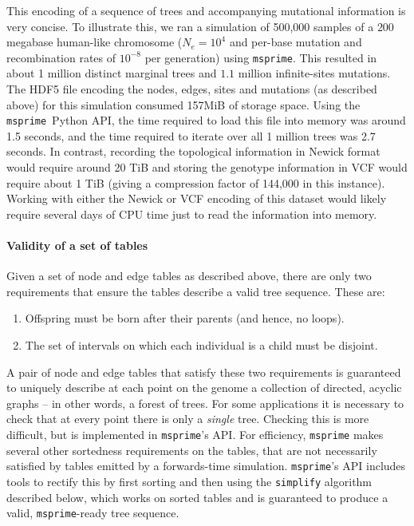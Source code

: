 \documentclass{article}
\newcommand{\msprime}{\texttt{msprime}}
\newcommand{\jda}[1]{{\em \color{cyan} #1}}
\begin{document}
This encoding of a sequence of trees and accompanying mutational information is
very concise. To illustrate this, we ran a simulation of 500,000 samples of a
$200$ megabase human-like chromosome ($N_e=10^4$ and per-base mutation and
recombination rates of $10^{-8}$ per generation) using \msprime. This resulted
in about 1 million distinct marginal trees and $1.1$ million infinite-sites
mutations. The HDF5 file encoding the nodes, edges, sites and mutations (as
described above) for this simulation consumed 157MiB of storage space. Using
the \msprime\ Python API, the time required to load this file into memory was
around 1.5 seconds, and the time required to iterate over all 1 million trees
was 2.7 seconds. In contrast, recording the topological information in Newick
format would require around 20 TiB and storing the genotype information
in VCF would require about 1 TiB (giving a compression factor of 144,000 in
this instance).
Working with either the Newick or VCF encoding
of this dataset would likely require several
days of CPU time just to read the information into memory.

\paragraph{Validity of a set of tables}
Given a set of node and edge tables as described above,
there are only two requirements that ensure the tables
describe a valid tree sequence.
These are:
\begin{enumerate}
    \item Offspring must be born after their parents (and hence, no loops).
    \item The set of intervals on which each individual is a child must be disjoint.
\end{enumerate}
A pair of node and edge tables that satisfy these two requirements
is guaranteed to uniquely describe at each point on the genome
a collection of directed, acyclic graphs -- in other words, a forest of trees.
For some applications it is necessary to check that at every point
there is only a \emph{single} tree.
Checking this is more difficult, but is implemented in \msprime{}'s API.
For efficiency, \msprime{} makes several other sortedness requirements on the tables,
that are not necessarily satisfied by tables emitted by a forwards-time simulation.
\msprime{}'s API includes tools to rectify this by first sorting %
and then using the \texttt{simplify} algorithm described below, which works on sorted tables
and is guaranteed to produce a valid, \msprime{}-ready tree sequence.
\end{document}

